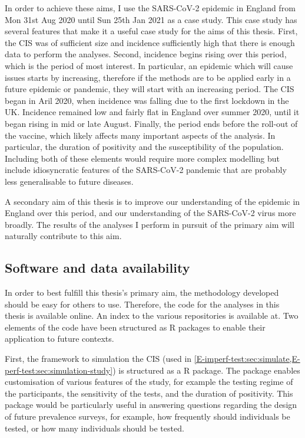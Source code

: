 \documentclass[thesis.tex]{subfiles}
\begin{document}
In order to achieve these aims, I use the SARS-CoV-2 epidemic in England from Mon 31st Aug 2020 until Sun 25th Jan 2021 as a case study.
This case study has several features that make it a useful case study for the aims of this thesis.
First, the CIS was of sufficient size and incidence sufficiently high that there is enough data to perform the analyses.
Second, incidence begins rising over this period, which is the period of most interest.
In particular, an epidemic which will cause issues starts by increasing, therefore if the methods are to be applied early in a future epidemic or pandemic, they will start with an increasing period.
The CIS began in Aril 2020, when incidence was falling due to the first lockdown in the UK.
Incidence remained low and fairly flat in England over summer 2020, until it began rising in mid or late August.
Finally, the period ends before the roll-out of the vaccine, which likely affects many important aspects of the analysis.
In particular, the duration of positivity and the susceptibility of the population.
Including both of these elements would require more complex modelling but include idiosyncratic features of the SARS-CoV-2 pandemic that are probably less generalisable to future diseases.

A secondary aim of this thesis is to improve our understanding of the epidemic in England over this period, and our understanding of the SARS-CoV-2 virus more broadly.
The results of the analyses I perform in pursuit of the primary aim will naturally contribute to this aim.

\subsection{Software and data availability}

In order to best fulfill this thesis's primary aim, the methodology developed should be easy for others to use.
Therefore, the code for the analyses in this thesis is available online.
An index to the various repositories is available at.
Two elements of the code have been structured as R packages to enable their application to future contexts.

First, the framework to simulation the CIS (used in \cref{E-imperf-test:sec:simulate,E-perf-test:sec:simulation-study}) is structured as a R package.
The package enables customisation of various features of the study, for example the testing regime of the participants, the sensitivity of the tests, and the duration of positivity.
This package would be particularly useful in answering questions regarding the design of future prevalence surveys, for example, how frequently should individuals be tested, or how many individuals should be tested.
\end{document}
